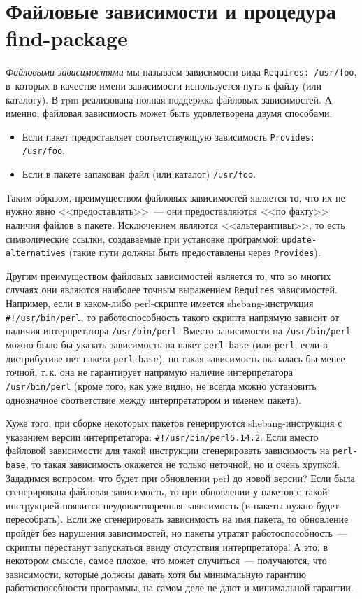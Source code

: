 \documentclass[russian,a4paper,12pt,titlepage]{article}
\begin{document}
\section{Файловые зависимости и процедура find-package}
\textit{Файловыми зависимостями} мы называем зависимости вида \verb|Requires: /usr/foo|,
в~которых в качестве имени зависимости используется путь к файлу (или каталогу).  В rpm реализована
полная поддержка файловых зависимостей.  А именно, файловая зависимость может быть удовлетворена двумя способами:
\begin{itemize}
\item Если пакет предоставляет соответствующую зависимость \verb|Provides: /usr/foo|.
\item Если в пакете запакован файл (или каталог) \verb|/usr/foo|.
\end{itemize}
Таким образом, преимуществом файловых зависимостей является то, что их не нужно явно <<предоставлять>>~---
они предоставляются <<по факту>> наличия файлов в пакете.  Исключением являются <<альтерантивы>>, то есть
символические ссылки, создаваемые при установке программой \verb|update-alternatives| (такие пути должны
быть предоставлены через \verb|Provides|).

Другим преимуществом файловых зависимостей является то, что во многих случаях они являются наиболее точным
выражением \verb|Requires| зависимостей.  Например, если в каком-либо perl-скрипте имеется shebang-инструкция
\verb|#!/usr/bin/perl|, то работоспособность такого скрипта напрямую зависит от наличия интерпретатора \verb|/usr/bin/perl|.
Вместо зависимости на \verb|/usr/bin/perl| можно было бы указать зависимость на пакет \verb|perl-base| (или \verb|perl|,
если в дистрибутиве нет пакета \verb|perl-base|), но такая зависимость оказалась бы менее точной, т.\,к. она не гарантирует
напрямую наличие интерпретатора \verb|/usr/bin/perl| (кроме того, как уже видно, не всегда можно установить однозначное
соответствие между интерпретатором и именем пакета).

Хуже того, при сборке некоторых пакетов генерируются shebang-инструкция с указанием версии интерпретатора: \verb|#!/usr/bin/perl5.14.2|.
Если вместо файловой зависимости для такой инструкции сгенерировать зависимость на \verb|perl-base|, то такая зависимость
окажется не только неточной, но и очень хрупкой.  Зададимся вопросом: что будет при обновлении perl до новой версии?
Если была сгенерирована файловая зависимость, то при обновлении у пакетов с такой инструкцией появится неудовлетворенная
зависимость (и пакеты нужно будет пересобрать).  Если же сгенерировать зависимость на имя пакета, то обновление пройдёт
без нарушения зависимостей, но пакеты утратят работоспособность~--- скрипты перестанут запускаться ввиду отсутствия
интерпретатора!  А это, в некотором смысле, самое плохое, что может случиться~--- получаются, что зависимости, которые
должны давать хотя бы минимальную гарантию работоспособности программы, на самом деле не дают и минимальной гарантии.
\end{document}
